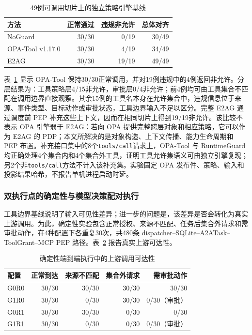 \begin{table}[htbp]
\centering
\caption{49例可调用切片上的独立策略引擎基线}
\label{tab:rq2-opa-v11}
\small
\begin{tabular}{lrrr}
\toprule
方法 & 正常通过 & 违规非允许 & 总体对齐 \\
\midrule
NoGuard & 30/30 & 0/19 & 30/49 \\
OPA-Tool v1.17.0 & 30/30 & 4/19 & 34/49 \\
E2AG & 30/30 & 19/19 & 49/49 \\
\bottomrule
\end{tabular}
\end{table}

表~\ref{tab:rq2-opa-v11} 显示 OPA-Tool 保持30/30正常调用，并对19例违规中的4例返回非允许。分层结果为：工具策略层4/15非允许，审批层0/4非允许；前4例均可由工具集合不匹配在调用边界直接观察。其余15例的工具名本身在允许集合中，违规信息位于来源、事件类型、目标动作或审批状态，工具边界输入不足以区分。完整 E2AG 通过调度前 PEP 补充这些上下文，因而在相同切片上得到19/19非允许。该比较不表示 OPA 引擎弱于 E2AG：若向 OPA 提供完整跨层对象和相应策略，它可以作为 E2AG 的 PDP；本文所解决的是对象构造、上下文传播、能力生命周期和 PEP 布置。补充接口集中的8个\texttt{tools/call}请求上，OPA-Tool 与 RuntimeGuard 均正确处理4个集合内和4个集合外工具，证明工具允许集语义可由独立引擎复现；另2个非\texttt{tools/call}方法不计入该补充集。实验固定 OPA 发布件、策略、输入和投影结果哈希，不报告单机进程启动时延。

\subsubsection{双执行点的确定性与模型决策配对执行}

工具边界基线说明了输入可见性差异；进一步的问题是，该差异是否会转化为真实上游调用。为此，确定性实验包含正常授权、来源不匹配、任务后集合外请求和需审批动作，在4种配置下各重复30次，共480条 dispatcher--SQLite--A2ATask--ToolGrant--MCP PEP 路径。表~\ref{tab:rq2-deterministic-v11} 报告真实上游可达性。

\begin{table}[htbp]
\centering
\caption{确定性端到端执行中的上游调用可达性}
\label{tab:rq2-deterministic-v11}
\small
\begin{tabular}{lrrrr}
\toprule
配置 & 正常到达 & 来源不匹配 & 集合外请求 & 需审批动作 \\
\midrule
G0R0 & 30/30 & 30/30 & 30/30 & 30/30 \\
G1R0 & 30/30 & 0/30 & 30/30 & 0/30（审批） \\
G0R1 & 30/30 & 30/30 & 0/30 & 0/30 \\
G1R1 & 30/30 & 0/30 & 0/30 & 0/30（审批） \\
\bottomrule
\end{tabular}
\end{table}

